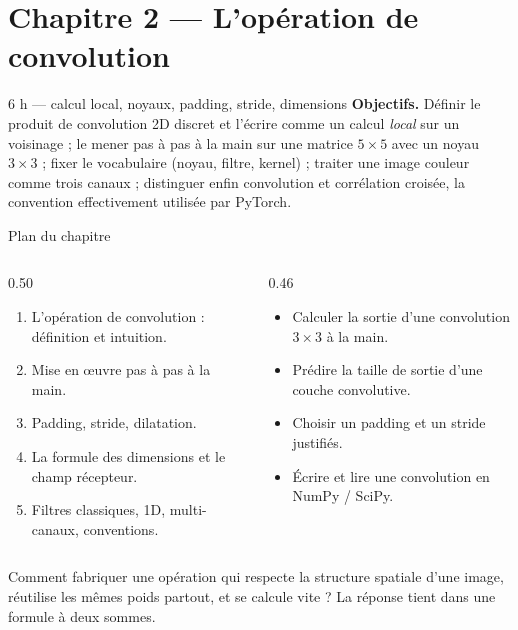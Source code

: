 \section{Chapitre 2 --- L'opération de convolution}

%
{6 h --- calcul local, noyaux, padding, stride, dimensions}%
{\textbf{Objectifs.} Définir le produit de convolution 2D discret et l'écrire comme un
calcul \emph{local} sur un voisinage ; le mener pas à pas à la main sur une matrice
$5 \times 5$ avec un noyau $3 \times 3$ ; fixer le vocabulaire (noyau, filtre, kernel) ;
traiter une image couleur comme trois canaux ; distinguer enfin convolution et
corrélation croisée, la convention effectivement utilisée par PyTorch.}

\begin{frame}{Plan du chapitre}
\begin{columns}[t]
\begin{column}{0.50\textwidth}
\begin{kbox}
\begin{enumerate}
  \item L'opération de convolution : définition et intuition.
  \item Mise en œuvre pas à pas à la main.
  \item Padding, stride, dilatation.
  \item La formule des dimensions et le champ récepteur.
  \item Filtres classiques, 1D, multi-canaux, conventions.
\end{enumerate}
\end{kbox}
\end{column}
\begin{column}{0.46\textwidth}
\begin{ebox}
\begin{itemize}
  \item Calculer la sortie d'une convolution $3 \times 3$ à la main.
  \item Prédire la taille de sortie d'une couche convolutive.
  \item Choisir un padding et un stride justifiés.
  \item Écrire et lire une convolution en NumPy / SciPy.
\end{itemize}
\end{ebox}
\end{column}
\end{columns}
\vspace{0.5mm}
\begin{wbox}
Comment fabriquer une opération qui respecte la structure spatiale d'une image,
réutilise les mêmes poids partout, et se calcule vite ? La réponse tient dans une
formule à deux sommes.
\end{wbox}
\end{frame}

